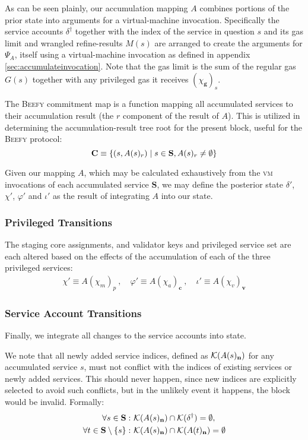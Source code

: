 As can be seen plainly, our accumulation mapping $A$ combines portions of the prior state into arguments for a virtual-machine invocation. Specifically the service accounts $\delta^\dagger$ together with the index of the service in question $s$ and its gas limit and wrangled refine-results $M(s)$ are arranged to create the arguments for $\Psi_A$, itself using a virtual-machine invocation as defined in appendix \ref{sec:accumulateinvocation}. Note that the gas limit is the sum of the regular gas $G(s)$ together with any privileged gas it receives $(\chi_\mathbf{g})_s$.

The \textsc{Beefy} commitment map is a function mapping all accumulated services to their accumulation result (the $r$ component of the result of $A$). This is utilized in determining the accumulation-result tree root for the present block, useful for the \textsc{Beefy} protocol:
\begin{equation}\label{eq:beefycommitment}
  \mathbf{C} \equiv \{ (s, A(s)_r) \mid s \in \mathbf{S}, A(s)_r \ne \emptyset \}
\end{equation}

Given our mapping $A$, which may be calculated exhaustively from the \textsc{vm} invocations of each accumulated service $\mathbf{S}$, we may define the posterior state $\delta'$, $\chi'$, $\varphi'$ and $\iota'$ as the result of integrating $A$ into our state.

\subsubsection{Privileged Transitions}
The staging core assignments, and validator keys and privileged service set are each altered based on the effects of the accumulation of each of the three privileged services:
\begin{align}
  \chi' \equiv A(\chi_m)_p \ ,\quad
  \varphi' \equiv A(\chi_a)_\mathbf{c} \ ,\quad
  \iota' \equiv A(\chi_v)_\mathbf{v}
\end{align}

\subsubsection{Service Account Transitions}
Finally, we integrate all changes to the service accounts into state.

We note that all newly added service indices, defined as $\mathcal{K}(A(s)_\mathbf{n})$ for any accumulated service $s$, must not conflict with the indices of existing services or newly added services. This should never happen, since new indices are explicitly selected to avoid such conflicts, but in the unlikely event it happens, the block would be invalid. Formally:
\begin{equation}
  \begin{aligned}
  \forall s \in \mathbf{S} :\ &\keys{A(s)_\mathbf{n}} \cap \keys{\delta^\dagger} = \none, \\
  \forall t \in \mathbf{S} \setminus \{s\} :\ &\keys{A(s)_\mathbf{n}} \cap \keys{A(t)_\mathbf{n}} = \none
\end{aligned}
\end{equation}

